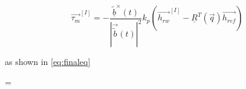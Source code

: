		
		\begin{equation}
		\vec{\tau_m}^{[I]} = -\frac{\underline{\tilde{b}}^\times(t)}{|\vec{\tilde{b}}(t) |^2} k_p\left(\vec{h_{rw}}^{[I]} - \underline{R}^T(\vec{q})\vec{h_{ref}} \right)
		\end{equation}
		
		
		
		as shown in \ref{eq:finaleq}
		\begin{flalign}
		  =  \underline \Omega \  
		\end{flalign} 
		
		
